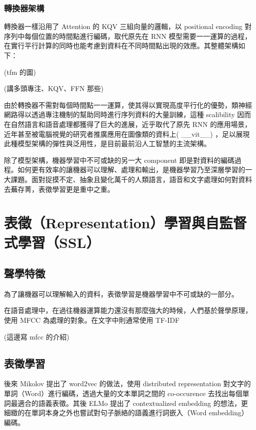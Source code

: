 \subsubsection{轉換器架構}

轉換器一樣沿用了 Attention 的 KQV 三組向量的邏輯，以 positional encoding 對序列中每個位置的時間點進行編碼，取代原先在 RNN 模型需要一一運算的過程，在實行平行計算的同時也能考慮到資料在不同時間點出現的效應。其整體架構如下：

(tfm 的圖)

(講多頭專注、KQV、FFN 那些)

由於轉換器不需對每個時間點一一運算，使其得以實現高度平行化的優勢，類神經網路得以透過專注機制的幫助同時進行序列資料的大量訓練，這種 scalibility 因而在自然語言和語音處理都獲得了巨大的進展，近乎取代了原先 RNN 的應用場景，近年甚至被電腦視覺的研究者推廣應用在圖像類的資料上( \_\_vit\_\_) ，足以展現此種模型架構的彈性與泛用性，是目前最前沿人工智慧的主流架構。

除了模型架構，機器學習中不可或缺的另一大 component 即是對資料的編碼過程。如何更有效率的讓機器可以理解、處理和輸出，是機器學習乃至深層學習的一大課題。面對捉摸不定、抽象且變化萬千的人類語言，語音和文字處理如何對資料去蕪存菁，表徵學習更是重中之重。

\section{表徵（Representation）學習與自監督式學習（SSL）}

\subsection{聲學特徵}

為了讓機器可以理解輸入的資料，表徵學習是機器學習中不可或缺的一部分。

在語音處理中，在過往機器運算能力還沒有那麼強大的時候，人們基於聲學原理，使用 MFCC 為處理的對象。在文字中則通常使用 TF-IDF

(這邊寫 mfcc 的介紹)

\subsection{表徵學習}

後來 Mikolov 提出了 word2vec 的做法，使用 distributed representation 對文字的單詞（Word）進行編碼，透過大量的文本單詞之間的 co-occurence 去找出每個單詞最適合的語義表徵。其後 ELMo 提出了 contextualized embedding 的想法，更細緻的在單詞本身之外也嘗試對句子脈絡的語義進行詞嵌入（Word embedding）編碼。

